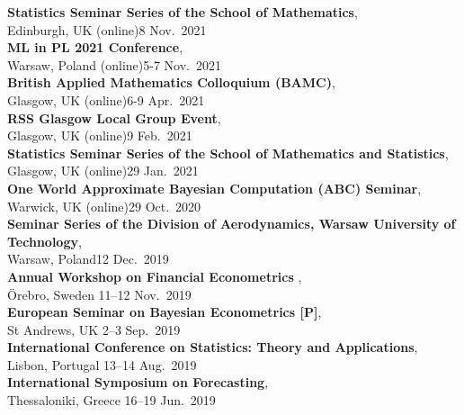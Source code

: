 \documentclass[margin,line]{resume}
\begin{document}
\begin{resume}
	\textbf{Statistics Seminar Series of the School of Mathematics},\\
	Edinburgh, UK (online)\hfill 8 Nov.\ 2021\vspace{1mm} \\
	\textbf{ML in PL 2021 Conference},\\
	Warsaw, Poland (online)\hfill 5-7 Nov.\ 2021\vspace{1mm} \\
	\textbf{British Applied Mathematics Colloquium (BAMC)},\\
	Glasgow, UK (online)\hfill 6-9 Apr.\ 2021\vspace{1mm} \\
	\textbf{RSS Glasgow Local Group Event},\\
	Glasgow, UK (online)\hfill 9 Feb.\ 2021 \vspace{1mm} \\
	\textbf{Statistics Seminar Series of the School of Mathematics and Statistics},\\
	Glasgow, UK (online)\hfill 29 Jan.\ 2021 \vspace{1mm} \\
	\textbf{One World Approximate Bayesian Computation (ABC) Seminar},\\
	Warwick, UK (online)\hfill 29 Oct.\ 2020\vspace{1mm} \\	
	\textbf{Seminar Series of the Division of Aerodynamics, Warsaw University of Technology},\\
	Warsaw, Poland\hfill 12 Dec.\ 2019 \vspace{1mm} \\
	\textbf{ Annual Workshop on Financial Econometrics },\\
	{\"O}rebro, Sweden \hfill 11--12 Nov.\ 2019 \vspace{1mm} \\
	\textbf{ European Seminar on Bayesian Econometrics [P]},\\
	St Andrews, UK \hfill 2--3 Sep.\ 2019 \vspace{1mm} \\
	\textbf{International Conference on Statistics: Theory and Applications},\\
	Lisbon, Portugal \hfill 13--14 Aug.\ 2019 \vspace{1mm} \\		
	\textbf{ International Symposium on Forecasting},\\
	Thessaloniki, Greece \hfill 16--19 Jun.\ 2019 \vspace{1mm} \\

\end{resume}
\end{document}
